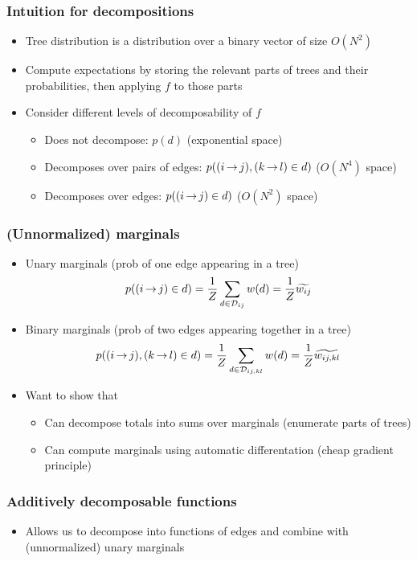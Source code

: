 \documentclass{beamer}
\begin{document}
\begin{frame}
\frametitle{Intuition for decompositions}
\begin{itemize}
\item Tree distribution is a distribution over a binary vector of size $O(N^2)$
\item Compute expectations by storing the relevant parts of trees and their probabilities,
    then applying $f$ to those parts
\item Consider different levels of decomposability of $f$
    \begin{itemize}
    \item Does not decompose: $p(d)$ (exponential space)
    \item Decomposes over pairs of edges: $p({(i\,{\rightarrow}\,j)},{(k\,{\rightarrow}\,l)} \in d)$ ($O(N^4)$ space)
    \item Decomposes over edges: $p({(i\,{\rightarrow}\,j)} \in d)$ ($O(N^2)$ space)
    \end{itemize}
\end{itemize}
\end{frame}

\begin{frame}
\frametitle{(Unnormalized) marginals}
\begin{itemize}
\item Unary marginals (prob of one edge appearing in a tree)
    $$p({(i\,{\rightarrow}\,j)} \in d) = \frac{1}{Z}\sum_{{d}\in{\mathcal{D}_{ij}}}{w({d})}
    = \frac{1}{Z}{\widetilde{w_{ij}}}$$
\item Binary marginals (prob of two edges appearing together in a tree)
    $$p({(i\,{\rightarrow}\,j)},{(k\,{\rightarrow}\,l)} \in d) =  \frac{1}{Z}\sum_{{d}\in{\mathcal{D}_{ij,kl}}}{w({d})}
    = \frac{1}{Z}{\widetilde{w_{ij,kl}}}$$

\item Want to show that
    \begin{itemize}
    \item Can decompose totals into sums over marginals (enumerate parts of trees)
    \item Can compute marginals using automatic differentation (cheap gradient principle)
    \end{itemize}
\end{itemize}
\end{frame}

\begin{frame}
\frametitle{Additively decomposable functions}
\begin{itemize}
\item Allows us to decompose into functions of edges and combine with (unnormalized)
    unary marginals
\end{itemize}
\end{frame}
\end{document}
